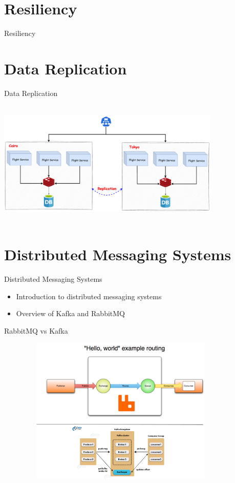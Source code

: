 \documentclass{beamer}
\begin{document}
\section{Resiliency}
\begin{frame}{Resiliency}
    		\begin{center}
   	 		
  		\end{center}
\end{frame}

\section{Data Replication}
\begin{frame}{Data Replication}
        \begin{center}
   	 		\includegraphics[width=0.8\textwidth, height=60mm, scale=1]{img/DR.png}
  		\end{center}
\end{frame}

\section{Distributed Messaging Systems}
\begin{frame}{Distributed Messaging Systems}
  \begin{itemize}
    \item Introduction to distributed messaging systems
    \item Overview of Kafka and RabbitMQ
  \end{itemize}
\end{frame}

\begin{frame}{RabbitMQ vs Kafka}
        \begin{center}
   	 		\includegraphics[width=120mm, height=70mm, scale=1]{img/kafkavsrmq.jpg}
  		\end{center}
\end{frame}
\end{document}
